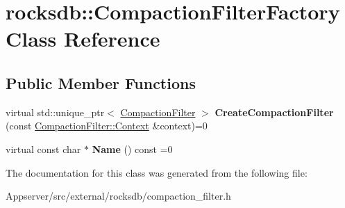\hypertarget{classrocksdb_1_1CompactionFilterFactory}{}\section{rocksdb\+:\+:Compaction\+Filter\+Factory Class Reference}
\label{classrocksdb_1_1CompactionFilterFactory}
\subsection*{Public Member Functions}
\begin{DoxyCompactItemize}
\item 
virtual std\+::unique\+\_\+ptr$<$ \hyperlink{classrocksdb_1_1CompactionFilter}{Compaction\+Filter} $>$ {\bfseries Create\+Compaction\+Filter} (const \hyperlink{structrocksdb_1_1CompactionFilter_1_1Context}{Compaction\+Filter\+::\+Context} \&context)=0\hypertarget{classrocksdb_1_1CompactionFilterFactory_aa10d1e526d33243a49ad98243d442ea1}{}\label{classrocksdb_1_1CompactionFilterFactory_aa10d1e526d33243a49ad98243d442ea1}

\item 
virtual const char $\ast$ {\bfseries Name} () const =0\hypertarget{classrocksdb_1_1CompactionFilterFactory_a83ee8a6459e6c2d6806f6221b834a750}{}\label{classrocksdb_1_1CompactionFilterFactory_a83ee8a6459e6c2d6806f6221b834a750}

\end{DoxyCompactItemize}


The documentation for this class was generated from the following file\+:\begin{DoxyCompactItemize}
\item 
Appserver/src/external/rocksdb/compaction\+\_\+filter.\+h\end{DoxyCompactItemize}
